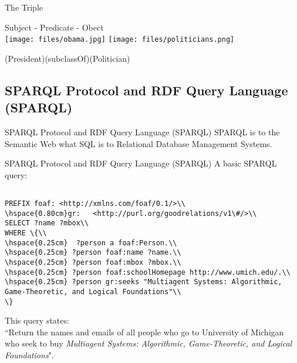 \documentclass{beamer}
\begin{document}
\begin{frame}{The Triple}
\begin{center}
{\Huge Subject - Predicate - Obect }\\
\vspace{10pt}
\texttt{[image: files/obama.jpg]}
\hspace{30pt}\raisebox{60pt}{\Huge $\subseteq$}\hspace{30pt}
\texttt{[image: files/politicians.png]}\\
\end{center}
\hspace{38pt}(President)\hspace{35pt}(subclassOf)\hspace{45pt}(Politician)\\
\begin{center}
\end{center}
\end{frame}

\subsection[SPARQL]{SPARQL Protocol and RDF Query Language (SPARQL)}
\begin{frame}{SPARQL Protocol and RDF Query Language (SPARQL)}
SPARQL is to the Semantic Web what SQL is to Relational Database Management Systems.
\end{frame}

\begin{frame}{SPARQL Protocol and RDF Query Language (SPARQL)}
A basic SPARQL query:
{\tiny\begin{verbatim}

PREFIX foaf: <http://xmlns.com/foaf/0.1/>\\
\hspace{0.80cm}gr:   <http://purl.org/goodrelations/v1\#/>\\
SELECT ?name ?mbox\\
WHERE \{\\
\hspace{0.25cm}  ?person a foaf:Person.\\
\hspace{0.25cm} ?person foaf:name ?name.\\
\hspace{0.25cm} ?person foaf:mbox ?mbox.\\
\hspace{0.25cm} ?person foaf:schoolHomepage http://www.umich.edu/.\\
\hspace{0.25cm} ?person gr:seeks "Multiagent Systems: Algorithmic, Game-Theoretic, and Logical Foundations"\\
\}
\end{verbatim}}
\pause

This query states:\\ ``Return the names and emails of all people who go to University of Michigan who seek to buy \textit{Multiagent Systems: Algorithmic, Game-Theoretic, and Logical Foundations}".
\end{frame}
\end{document}
